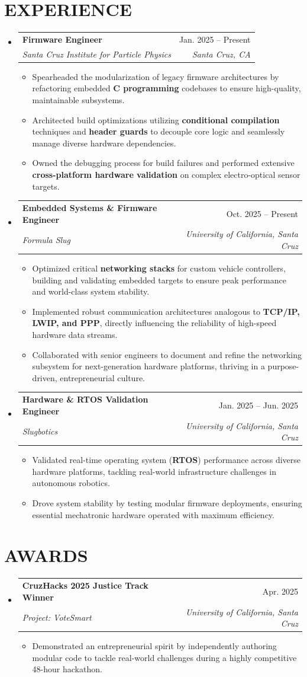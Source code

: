 \documentclass[letterpaper,11pt]{article}
\makeatletter
\newcommand{\resumeItem}[1]{
  \item\small{
    {#1 \vspace{-2pt}}
  }
}
\newcommand{\resumeSubheading}[4]{
  \vspace{-2pt}\item
    \begin{tabular*}{0.97\textwidth}[t]{l@{\extracolsep{\fill}}r}
      \textbf{#1} & #2 \\
      \textit{\small#3} & \textit{\small #4} \\
    \end{tabular*}\vspace{-7pt}
}
\newcommand{\resumeSubHeadingListStart}{\begin{itemize}[leftmargin=0.15in, label={}]}
\newcommand{\resumeSubHeadingListEnd}{\end{itemize}}
\newcommand{\resumeItemListStart}{\begin{itemize}}
\newcommand{\resumeItemListEnd}{\end{itemize}\vspace{-5pt}}
\makeatother
\begin{document}
\section{EXPERIENCE}
  \resumeSubHeadingListStart
    \resumeSubheading
      {Firmware Engineer}{Jan. 2025 -- Present}
      {Santa Cruz Institute for Particle Physics}{Santa Cruz, CA}
      \resumeItemListStart
        \resumeItem{Spearheaded the modularization of legacy firmware architectures by refactoring embedded \textbf{C programming} codebases to ensure high-quality, maintainable subsystems.}
        \resumeItem{Architected build optimizations utilizing \textbf{conditional compilation} techniques and \textbf{header guards} to decouple core logic and seamlessly manage diverse hardware dependencies.}
        \resumeItem{Owned the debugging process for build failures and performed extensive \textbf{cross-platform hardware validation} on complex electro-optical sensor targets.}
      \resumeItemListEnd
    \resumeSubheading
      {Embedded Systems \& Firmware Engineer}{Oct. 2025 -- Present}
      {Formula Slug}{University of California, Santa Cruz}
      \resumeItemListStart
        \resumeItem{Optimized critical \textbf{networking stacks} for custom vehicle controllers, building and validating embedded targets to ensure peak performance and world-class system stability.}
        \resumeItem{Implemented robust communication architectures analogous to \textbf{TCP/IP, LWIP, and PPP}, directly influencing the reliability of high-speed hardware data streams.}
        \resumeItem{Collaborated with senior engineers to document and refine the networking subsystem for next-generation hardware platforms, thriving in a purpose-driven, entrepreneurial culture.}
      \resumeItemListEnd
    \resumeSubheading
      {Hardware \& RTOS Validation Engineer}{Jan. 2025 -- Jun. 2025}
      {Slugbotics}{University of California, Santa Cruz}
      \resumeItemListStart
        \resumeItem{Validated real-time operating system (\textbf{RTOS}) performance across diverse hardware platforms, tackling real-world infrastructure challenges in autonomous robotics.}
        \resumeItem{Drove system stability by testing modular firmware deployments, ensuring essential mechatronic hardware operated with maximum efficiency.}
      \resumeItemListEnd
  \resumeSubHeadingListEnd


\section{AWARDS}
  \resumeSubHeadingListStart
    \resumeSubheading
      {CruzHacks 2025 Justice Track Winner}{Apr. 2025}
      {Project: VoteSmart}{University of California, Santa Cruz}
      \resumeItemListStart
        \resumeItem{Demonstrated an entrepreneurial spirit by independently authoring modular code to tackle real-world challenges during a highly competitive 48-hour hackathon.}
      \resumeItemListEnd
  \resumeSubHeadingListEnd
\end{document}
